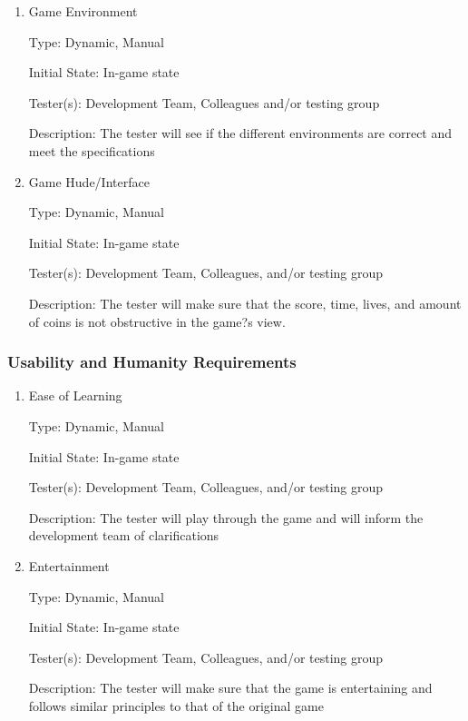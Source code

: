\documentclass[12pt, titlepage]{article}
\begin{document}
\begin{enumerate}

\item{Game Environment\\}

Type: Dynamic, Manual

Initial State: In-game state

Tester(s): Development Team, Colleagues and/or testing group

Description: The tester will see if the different environments are correct and meet the specifications
					
\item{Game Hude/Interface\\}

Type: Dynamic, Manual

Initial State: In-game state

Tester(s): Development Team, Colleagues, and/or testing group

Description: The tester will make sure that the score, time, lives, and amount of coins is not obstructive in the game?s view.

\end{enumerate}

\subsubsection{Usability and Humanity Requirements}

\begin{enumerate}

\item{Ease of Learning\\}

Type: Dynamic, Manual

Initial State: In-game state

Tester(s): Development Team, Colleagues, and/or testing group

Description: The tester will play through the game and will inform the development team of clarifications

\item{Entertainment\\}

Type: Dynamic, Manual

Initial State: In-game state

Tester(s): Development Team, Colleagues, and/or testing group

Description: The tester will make sure that the game is entertaining and follows similar principles to that of the original game

\end{enumerate}
\end{document}
